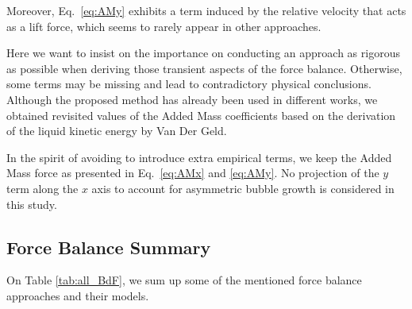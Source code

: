 Moreover, Eq.~\ref{eq:AMy} exhibits a term induced by the relative velocity that acts as a lift force, which seems to rarely appear in other approaches.

\npar
Here we want to insist on the importance on conducting an approach as rigorous as possible when deriving those transient aspects of the force balance. Otherwise, some terms may be missing and lead to contradictory physical conclusions. Although the proposed method has already been used in different works, we obtained revisited values of the Added Mass coefficients based on the derivation of the liquid kinetic energy by Van Der Geld.

In the spirit of avoiding to introduce extra empirical terms, we keep the Added Mass force as presented in Eq.~\ref{eq:AMx} and \ref{eq:AMy}. No projection of the $y$ term along the $x$ axis to account for asymmetric bubble growth is considered in this study.


\subsection{Force Balance Summary}\label{subsec:BdF}


On Table \ref{tab:all_BdF}, we sum up some of the mentioned force balance approaches and their models.




